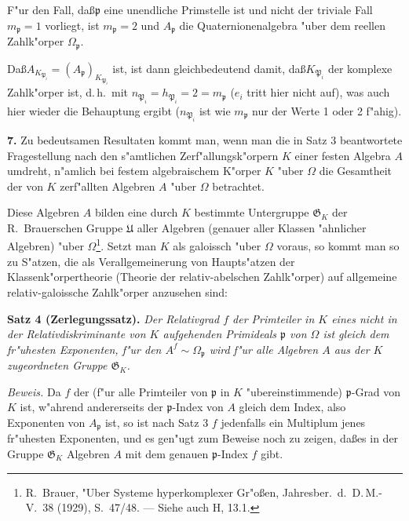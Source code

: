 \documentclass[12pt,a4paper]{article}
\theoremstyle{plain}
\begin{document}
F"ur den Fall, da\ss $\mathfrak{p}$ eine unendliche Primstelle ist und nicht der triviale Fall $m_\mathfrak{p} = 1$ vorliegt, ist $m_\mathfrak{p} = 2$ und $A_\mathfrak{p}$ die Quaternionenalgebra "uber dem reellen Zahlk"orper $\Omega_\mathfrak{p}$.

Da\ss $A_{K_{\mathfrak{P}_i}} = (A_\mathfrak{p})_{K_{\mathfrak{P}_i}}$ ist, ist dann gleichbedeutend damit, da\ss $K_{\mathfrak{P}_i}$ der komplexe Zahlk"orper ist, d.\,h.\ mit $n_{\mathfrak{P}_i} = h_{\mathfrak{P}_i} = 2 = m_\mathfrak{p}$ ($e_i$ tritt hier nicht auf), was auch hier wieder die Behauptung ergibt ($n_{\mathfrak{P}_i}$ ist wie $m_\mathfrak{p}$ nur der Werte 1 oder 2 f"ahig).

\medskip\noindent\textbf{7.}
Zu bedeutsamen Resultaten kommt man, wenn man die in Satz 3 beantwortete Fragestellung nach den s"amtlichen Zerf"allungsk"orpern $K$ einer festen Algebra $A$ umdreht, n"amlich bei festem algebraischem K"orper $K$ "uber $\Omega$ die Gesamtheit der von $K$ zerf"allten Algebren $A$ "uber $\Omega$ betrachtet.

Diese Algebren $A$ bilden eine durch $K$ bestimmte Untergruppe $\mathfrak{G}_K$ der R.\ Brauerschen Gruppe $\mathfrak{U}$ aller Algebren (genauer aller Klassen "ahnlicher Algebren) "uber $\Omega$\footnote{R.\ Brauer, "Uber Systeme hyperkomplexer Gr"o\ss en, Jahresber.\ d.\ D.\,M.-V.\ 38 (1929), S.\ 47/48. --- Siehe auch H, 13.1.}. Setzt man $K$ als galoissch "uber $\Omega$ voraus, so kommt man so zu S"atzen, die als Verallgemeinerung von Haupts"atzen der Klassenk"orpertheorie (Theorie der relativ-abelschen Zahlk"orper) auf allgemeine relativ-galoissche Zahlk"orper anzusehen sind:

\medskip\noindent\textbf{Satz 4 (Zerlegungssatz).}
\textit{Der Relativgrad $f$ der Primteiler in $K$ eines nicht in der Relativdiskriminante von $K$ aufgehenden Primideals $\mathfrak{p}$ von $\Omega$ ist gleich dem fr"uhesten Exponenten, f"ur den $A^f \sim \Omega_\mathfrak{p}$ wird f"ur alle Algebren $A$ aus der $K$ zugeordneten Gruppe $\mathfrak{G}_K$.}

\noindent\textit{Beweis.}
Da $f$ der (f"ur alle Primteiler von $\mathfrak{p}$ in $K$ "ubereinstimmende) $\mathfrak{p}$-Grad von $K$ ist, w"ahrend andererseits der $\mathfrak{p}$-Index von $A$ gleich dem Index, also Exponenten von $A_\mathfrak{p}$ ist, so ist nach Satz 3 $f$ jedenfalls ein Multiplum jenes fr"uhesten Exponenten, und es gen"ugt zum Beweise noch zu zeigen, da\ss es in der Gruppe $\mathfrak{G}_K$ Algebren $A$ mit dem genauen $\mathfrak{p}$-Index $f$ gibt.
\end{document}
